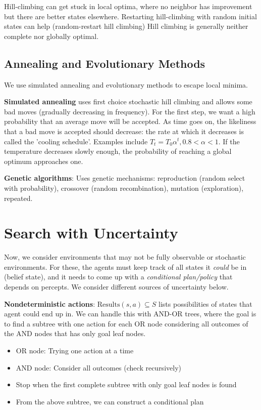 \documentclass{report}
\begin{document}
Hill-climbing can get stuck in  local optima, where no neighbor has improvement but there are better states elsewhere. Restarting hill-climbing with random initial states can help (random-restart hill climbing) Hill climbing is generally neither complete nor globally optimal.

\section{Annealing and Evolutionary Methods}

We use simulated annealing and evolutionary methods to escape local minima.

\textbf{Simulated annealing} uses first choice stochastic hill climbing and allows some bad moves (gradually decreasing in frequency). For the first step, we want a high probability that an average move will be accepted. As time goes on, the likeliness that a bad move is accepted should decrease: the rate at which it decreases is called the 'cooling schedule'. Examples include $T_t=T_0\alpha^t, 0.8<\alpha<1$. If the temperature decreases slowly enough, the probability of reaching a global optimum approaches one.

\textbf{Genetic algorithms}: Uses genetic mechanisms: reproduction (random select with probability), crossover (random recombination), mutation (exploration), repeated.

\chapter{Search with Uncertainty}

Now, we consider environments that may not be fully observable or stochastic environments. For these, the agents must keep track of all states it \emph{could} be in (belief state), and it needs to come up with a \emph{conditional plan/policy} that depends on percepts. We consider different sources of uncertainty below.

\textbf{Nondeterministic actions}: $\mathrm{Results}(s,a)\subseteq S$ lists possibilities of states that agent could end up in. We can handle this with AND-OR trees, where the goal is to find a subtree with one action for each OR node considering all outcomes of the AND nodes that has only goal leaf nodes.
\begin{itemize}
    \item OR node: Trying one action at a time
    \item AND node: Consider all outcomes (check recursively)
    \item Stop when the first complete subtree with only goal leaf nodes is found
    \item From the above subtree, we can construct a conditional plan
\end{itemize}
\end{document}
